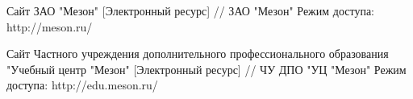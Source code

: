 \begingroup
\renewcommand{\section}[2]{\anonsection{Список использованных источников}}
\begin{thebibliography}{00}
        Сайт ЗАО "Мезон"
        [Электронный ресурс] //
        ЗАО "Мезон"
        Режим доступа: http://meson.ru/

        Сайт Частного учреждения дополнительного профессионального образования "Учебный центр "Мезон"
        [Электронный ресурс] //
        ЧУ ДПО "УЦ "Мезон"
        Режим доступа: http://edu.meson.ru/
    
    

\end{thebibliography}
\endgroup

\clearpage

